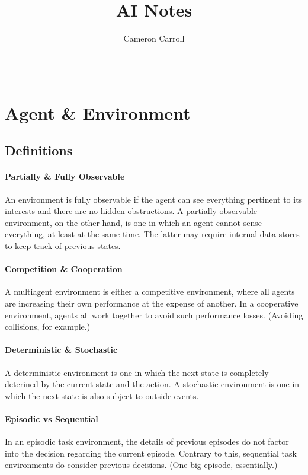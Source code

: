 \documentclass[11pt,letterpaper]{article}
\begin{document}
\title{AI Notes}
\author{Cameron Carroll}
\maketitle

\tableofcontents
\vspace{1cm}
\hrule

\section{Agent \& Environment}

\subsection{Definitions}
\paragraph{Partially \& Fully Observable}
An environment is fully observable if the agent can see everything pertinent to its interests and there are no hidden obstructions. A partially observable environment, on the other hand, is one in which an agent cannot sense everything, at least at the same time. The latter may require internal data stores to keep track of previous states.

\paragraph{Competition \& Cooperation}
A multiagent environment is either a competitive environment, where all agents are increasing their own performance at the expense of another. In a cooperative environment, agents all work together to avoid such performance losses. (Avoiding collisions, for example.)

\paragraph{Deterministic \& Stochastic}
A deterministic environment is one in which the next state is completely deterined by the current state and the action. A stochastic environment is one in which the next state is also subject to outside events.

\paragraph{Episodic vs Sequential}
In an episodic task environment, the details of previous episodes do not factor into the decision regarding the current episode. Contrary to this, sequential task environments do consider previous decisions. (One big episode, essentially.)
\end{document}
